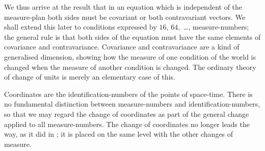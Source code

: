 \documentclass[12pt]{book}
\begin{document}
We thus arrive at the result that in an equation which is independent
of the measure\hyp{}plan both sides must be covariant or both contravariant
vectors. We shall extend this later to conditions expressed by $16$, $64$,~\dots,
measure\hyp{}numbers; the general rule is that both sides of the equation must
have the same elements of covariance and contravariance. Covariance and
contravariance are a kind of generalised dimension, showing how the measure
of one condition of the world is changed when the measure of another condition
is changed. The ordinary theory of change of units is merely an
elementary case of this.

Coordinates are the identification\hyp{}numbers of the points of space-time.
There is no fundamental distinction between measure\hyp{}numbers and identification\hyp{}numbers,
so that we may regard the change of coordinates as part of the
general change applied to all measure\hyp{}numbers. The change of coordinates
no longer leads the way, as it did in ; it is placed on the same level with
the other changes of measure.
\end{document}
